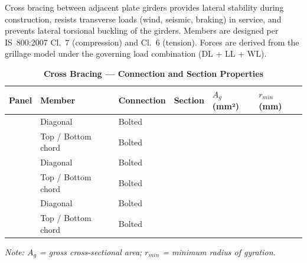 \documentclass[12pt,a4paper]{report}
\numberwithin{table}{chapter}
\numberwithin{figure}{chapter}
\begin{document}
Cross bracing between adjacent plate girders provides lateral stability during construction, resists transverse loads (wind, seismic, braking) in service, and prevents lateral torsional buckling of the girders. Members are designed per IS~800:2007 Cl.~7 (compression) and Cl.~6 (tension). Forces are derived from the grillage model under the governing load combination  (DL + LL + WL).

\vspace{1em}

\vspace{0.4em}
\noindent
\setlength{\tabcolsep}{4pt}
\setlength\LTleft{0pt}
\setlength\LTright{\fill}

\begin{longtable}{|C{2.0cm}|L{2.0cm}|L{2.2cm}|C{2.5cm}|C{2.0cm}|C{2.0cm}|}
\caption{\textbf{Cross Bracing --- Connection and Section Properties}} \\
\hline
\textbf{Panel} & \textbf{Member} & \textbf{Connection} & \textbf{Section} & \textbf{$A_g$ (mm²)} & \textbf{$r_{min}$ (mm)} \\[6pt]
\hline
{} & Diagonal & Bolted &  &  &  \\[6pt]
 & Top / Bottom chord & Bolted &  &  &  \\[6pt]
\hline
{} & Diagonal & Bolted &  &  &  \\[6pt]
 & Top / Bottom chord & Bolted &  &  &  \\[6pt]
\hline
{} & Diagonal & Bolted &  &  &  \\[6pt]
 & Top / Bottom chord & Bolted &  &  &  \\[6pt]
\hline
\end{longtable}
\noindent\textit{Note: $A_g$ = gross cross-sectional area; $r_{min}$ = minimum radius of gyration.}
\end{document}
